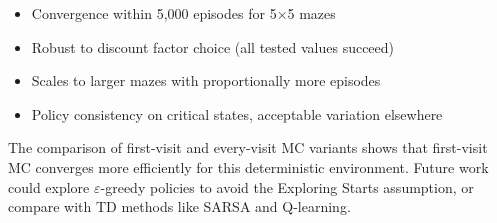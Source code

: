 \documentclass[letterpaper]{article}
\begin{document}
\begin{itemize}
    \item Convergence within 5,000 episodes for 5$\times$5 mazes
    \item Robust to discount factor choice (all tested values succeed)
    \item Scales to larger mazes with proportionally more episodes
    \item Policy consistency on critical states, acceptable variation elsewhere
\end{itemize}

The comparison of first-visit and every-visit MC variants shows that first-visit MC converges more efficiently for this deterministic environment. Future work could explore $\varepsilon$-greedy policies to avoid the Exploring Starts assumption, or compare with TD methods like SARSA and Q-learning.


\end{document}
